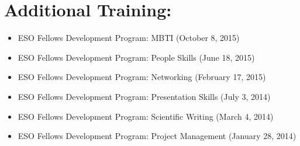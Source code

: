 \section*{Additional Training:}
\begin{itemize}
\itemsep-3pt
    \item ESO Fellows Development Program: MBTI (October 8, 2015)
    \item ESO Fellows Development Program: People Skills (June 18, 2015)
    \item ESO Fellows Development Program: Networking (February 17, 2015)
    \item ESO Fellows Development Program: Presentation Skills (July 3, 2014)
    \item ESO Fellows Development Program: Scientific Writing (March 4, 2014)
    \item ESO Fellows Development Program: Project Management (January 28, 2014)
\end{itemize}

